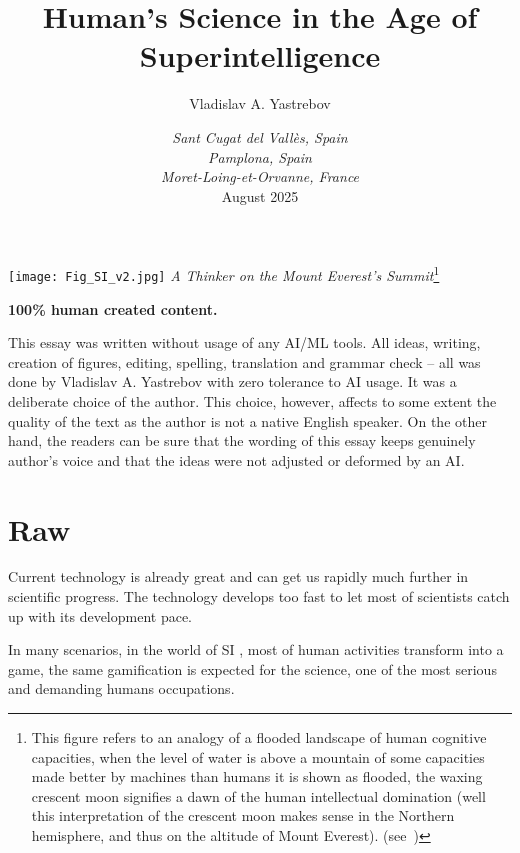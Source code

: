 \documentclass[a4paper,11pt]{article}
\title{Human's Science in the Age of Superintelligence}
\author{Vladislav A. Yastrebov}
\date{\footnotesize\textit{Sant Cugat del Vall\`es, Spain}\\
\textit{Pamplona, Spain}\\
\textit{Moret-Loing-et-Orvanne, France}\\
August 2025}
\begin{document}
\maketitle

\begin{center}
    \texttt{[image: Fig\_SI\_v2.jpg]}
    \textit{A Thinker on the Mount Everest's Summit}\footnote{This figure refers to an analogy of a flooded landscape of human cognitive capacities, when the level of water is above a mountain of some capacities made better by machines than humans it is shown as flooded, the waxing crescent moon signifies a dawn of the human intellectual domination (well this interpretation of the crescent moon makes sense in the Northern hemisphere, and thus on the altitude of Mount Everest). (see~\parencite{Tegmark2017}) }

    \vspace{0.5cm}
    \footnotesize 
    \textbf{100\% human created content.} 
\end{center}
\vspace{-1em}
\footnotesize \noindent
This essay was written without usage of any AI/ML tools. All ideas, writing, creation of figures, editing, spelling, translation and grammar check -- all was done by Vladislav A. Yastrebov with zero tolerance to AI usage. It was a deliberate choice of the author. This choice, however, affects to some extent the quality of the text as the author is not a native English speaker. On the other hand, the readers can be sure that the wording of this essay keeps genuinely author's voice and that the ideas were not adjusted or deformed by an AI.

    \newpage
 	\tableofcontents


    \printnomenclature

    \section{Raw}

    Current technology is already great and can get us rapidly much further in scientific progress. The technology develops too fast to let most of scientists catch up with its development pace.

    In many scenarios, in the world of SI , most of human activities transform into a game, the same gamification is expected for the science, one of the most serious and demanding humans occupations.
    
\end{document}
